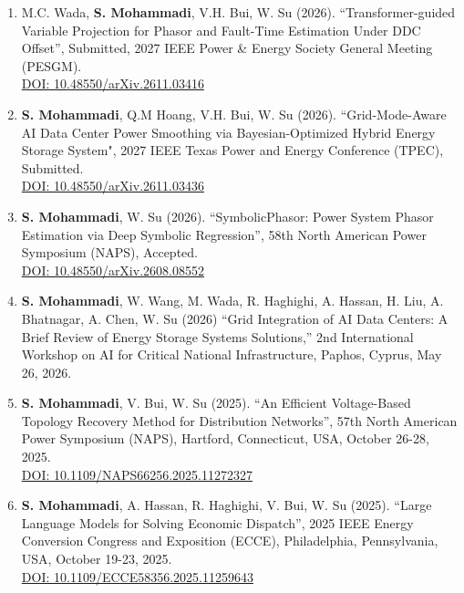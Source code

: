 \documentclass[a4paper,8pt]{article}
\begin{document}
\begin{itemize}
\begin{enumerate}
         \item
         M.C. Wada, \textbf{S. Mohammadi}, V.H. Bui, W. Su (2026). “Transformer-guided Variable Projection for Phasor and Fault-Time Estimation Under DDC Offset”, Submitted, 2027 IEEE Power \& Energy Society General Meeting (PESGM).\\
         \href{https://doi.org/10.48550/arXiv.2611.03416}{DOI: 10.48550/arXiv.2611.03416}

         \item
         \textbf{S. Mohammadi}, Q.M Hoang, V.H. Bui, W. Su (2026). “Grid-Mode-Aware AI Data Center Power Smoothing via Bayesian-Optimized Hybrid Energy Storage System", 2027 IEEE Texas Power and Energy Conference (TPEC), Submitted.\\
        \href{https://doi.org/10.48550/arXiv.2611.03436}{DOI: 10.48550/arXiv.2611.03436}

        \item
         \textbf{S. Mohammadi}, W. Su (2026). “SymbolicPhasor: Power System Phasor Estimation via Deep Symbolic Regression”, 58th North American Power Symposium (NAPS), Accepted.\\
         \href{https://doi.org/10.48550/arXiv.2608.08552}{DOI: 10.48550/arXiv.2608.08552}

         \item
         \textbf{S. Mohammadi}, W. Wang, M. Wada, R. Haghighi, A. Hassan, H. Liu, A. Bhatnagar, A. Chen, W. Su (2026) “Grid Integration of AI Data Centers: A Brief Review of Energy Storage Systems Solutions,” 2nd International Workshop on AI for Critical National Infrastructure, Paphos, Cyprus, May 26, 2026.
         
        \item
         \textbf{S. Mohammadi}, V. Bui, W. Su (2025). “An Efficient Voltage-Based Topology Recovery Method for Distribution Networks”, 57th North American Power Symposium (NAPS), Hartford, Connecticut, USA, October 26-28, 2025.\\
        \href{https://doi.org/10.1109/NAPS66256.2025.11272327}{DOI: 10.1109/NAPS66256.2025.11272327}

        \item 
        \textbf{S. Mohammadi}, A. Hassan, R. Haghighi, V. Bui, W. Su (2025). “Large Language Models for Solving Economic Dispatch”, 2025 IEEE Energy Conversion Congress and Exposition (ECCE), Philadelphia, Pennsylvania, USA, October 19-23, 2025.\\
        \href{https://doi.org/10.1109/ECCE58356.2025.11259643}{DOI: 10.1109/ECCE58356.2025.11259643}


\end{enumerate}
\end{itemize}
\end{document}
